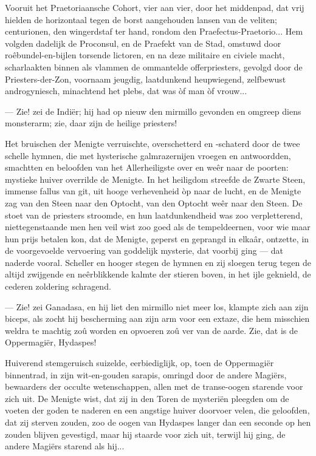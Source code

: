 \documentclass[a4paper, 12pt, oneside, dutch]{article}
\begin{document}
Vooruit het Praetoriaansche Cohort, vier aan vier, door het middenpad, dat vrij hielden de horizontaal tegen de borst aangehouden lansen van de veliten; centurionen, den wingerdstaf ter hand, rondom den Praefectus-Praetorio... Hem volgden dadelijk de Proconsul, en de Praefekt van de Stad, omstuwd door roêbundel-en-bijlen torsende lictoren, en na deze militaire en civiele macht, scharlaakten binnen als vlammen de ommantelde offerpriesters, gevolgd door de Priesters-der-Zon, voornaam jeugdig, laatdunkend heupwiegend, zelfbewust androgyniesch, minachtend het plebs, dat was òf man òf vrouw...

--- Zie! zei de Indiër; hij had op nieuw den mirmillo gevonden en omgreep diens monsterarm; zie, daar zijn de heilige priesters!

Het bruischen der Menigte verruischte, overschetterd en -schaterd door de twee schelle hymnen, die met hysterische galmrazernijen vroegen en antwoordden, smachtten en beloofden van het Allerheiligste over en weêr naar de poorten: mystieke huiver overrilde de Menigte. In het heiligdom streefde de Zwarte Steen, immense fallus van git, uit hooge verhevenheid òp naar de lucht, en de Menigte zag van den Steen naar den Optocht, van den Optocht weêr naar den Steen. De stoet van de priesters stroomde, en hun laatdunkendheid was zoo verpletterend, niettegenstaande men hen veil wist zoo goed als de tempeldeernen, voor wie maar hun prijs betalen kon, dat de Menigte, geperst en geprangd in elkaâr, ontzette, in de voorgevoelde vervoering van goddelijk mysterie, dat voorbij ging --- dat naderde vooral. Scheller en hooger stegen de hymnen en zij sloegen terug tegen de altijd zwijgende en neêrblikkende kalmte der stieren boven, in het ijle geknield, de cederen zoldering schragend.

--- Zie! zei Ganadasa, en hij liet den mirmillo niet meer los, klampte zich aan zijn biceps, als zocht hij bescherming aan zijn arm voor een extaze, die hem misschien weldra te machtig zoû worden en opvoeren zoû ver van de aarde. Zie, dat is de Oppermagiër, Hydaspes!

Huiverend stemgeruisch suizelde, eerbiediglijk, op, toen de Oppermagiër binnentrad, in zijn wit-en-gouden sarapis, omringd door de andere Magiërs, bewaarders der occulte wetenschappen, allen met de transe-oogen starende voor zich uit. De Menigte wist, dat zij in den Toren de mysteriën pleegden om de voeten der goden te naderen en een angstige huiver doorvoer velen, die geloofden, dat zij sterven zouden, zoo de oogen van Hydaspes langer dan een seconde op hen zouden blijven gevestigd, maar hij staarde voor zich uit, terwijl hij ging, de andere Magiërs starend als hij...
\end{document}
